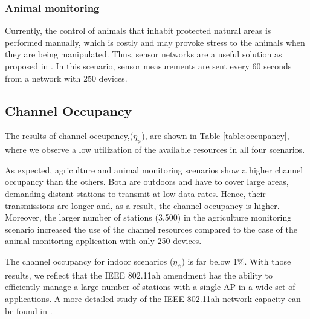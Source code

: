 \documentclass[]{article}
\begin{document}
\subsubsection{Animal monitoring}

Currently, the control of animals that inhabit protected natural areas is performed manually, which is costly and may provoke stress to the animals when they are being manipulated. Thus, sensor networks are a useful solution as proposed in \cite{scenario4}. In this scenario, sensor measurements are sent every 60 seconds from a network with 250 devices.

\subsection{Channel Occupancy}


The results of channel occupancy,($\eta_{\psi}$), are shown in Table \ref{table:occupancy}, where we observe a low utilization of the available resources in all four scenarios. 

As expected, agriculture and animal monitoring scenarios show a higher channel occupancy than the others. Both are outdoors and have to cover large areas, demanding distant stations to transmit at low data rates. Hence, their transmissions are longer and, as a result, the channel occupancy is higher. Moreover, the larger number of stations (3,500) in the agriculture monitoring scenario increased the use of the channel resources compared to the case of the animal monitoring application with only 250 devices.

The channel occupancy for indoor scenarios ($\eta_{\psi}$) is far below 1\%. With those results, we reflect that the IEEE 802.11ah amendment has the ability to efficiently manage a large number of stations with a single AP in a wide set of applications. A more detailed study of the IEEE 802.11ah network capacity can be found in \cite{adame2013}.
\end{document}

